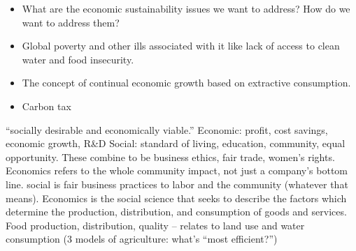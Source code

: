 \documentclass[12pt]{article}
\begin{document}
\begin{itemize}
\item{What are the economic sustainability issues we want to address? How do we want to address them?}
\item{Global poverty and other ills associated with it like lack of access to clean water and food insecurity.}
\item{The concept of continual economic growth based on extractive consumption.}
\item{Carbon tax}
\end{itemize}
%
%
%


``socially desirable and economically viable.''
Economic: profit, cost savings, economic growth, R\&D
Social: standard of living, education, community, equal opportunity. These combine to be business ethics, fair trade, women's rights.
Economics refers to the whole community impact, not just a company's bottom line.
social is fair business practices to labor and the community (whatever that means).
Economics is the social science that seeks to describe the factors which determine the production, distribution, and consumption of goods and services.
Food production, distribution, quality -- relates to land use and water consumption (3 models of agriculture: what's ``most efficient?'')
\end{document}
